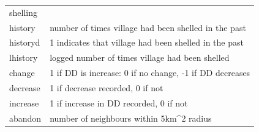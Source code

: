 \documentclass[]{article}
\theoremstyle{definition}
\theoremstyle{definition}
\theoremstyle{definition}
\theoremstyle{remark}
\begin{document}
\begin{longtable}[]{@{}ll@{}}
\begin{minipage}[t]{0.50\columnwidth}
shelling\strut
\end{minipage}\tabularnewline
\begin{minipage}[t]{0.12\columnwidth}\raggedright\strut
history\strut
\end{minipage} & \begin{minipage}[t]{0.50\columnwidth}\raggedright\strut
number of times village had been shelled in the past\strut
\end{minipage}\tabularnewline
\begin{minipage}[t]{0.12\columnwidth}\raggedright\strut
historyd\strut
\end{minipage} & \begin{minipage}[t]{0.50\columnwidth}\raggedright\strut
1 indicates that village had been shelled in the past\strut
\end{minipage}\tabularnewline
\begin{minipage}[t]{0.12\columnwidth}\raggedright\strut
lhistory\strut
\end{minipage} & \begin{minipage}[t]{0.50\columnwidth}\raggedright\strut
logged number of times village had been shelled\strut
\end{minipage}\tabularnewline
\begin{minipage}[t]{0.12\columnwidth}\raggedright\strut
change\strut
\end{minipage} & \begin{minipage}[t]{0.50\columnwidth}\raggedright\strut
1 if DD is increase: 0 if no change, -1 if DD decreases\strut
\end{minipage}\tabularnewline
\begin{minipage}[t]{0.12\columnwidth}\raggedright\strut
decrease\strut
\end{minipage} & \begin{minipage}[t]{0.50\columnwidth}\raggedright\strut
1 if decrease recorded, 0 if not\strut
\end{minipage}\tabularnewline
\begin{minipage}[t]{0.12\columnwidth}\raggedright\strut
increase\strut
\end{minipage} & \begin{minipage}[t]{0.50\columnwidth}\raggedright\strut
1 if increase in DD recorded, 0 if not\strut
\end{minipage}\tabularnewline
\begin{minipage}[t]{0.12\columnwidth}\raggedright\strut
abandon\strut
\end{minipage} & \begin{minipage}[t]{0.50\columnwidth}\raggedright\strut
number of neighbours within 5km\^{}2 radius\strut
\end{minipage}\tabularnewline
\bottomrule
\end{longtable}
\end{document}
